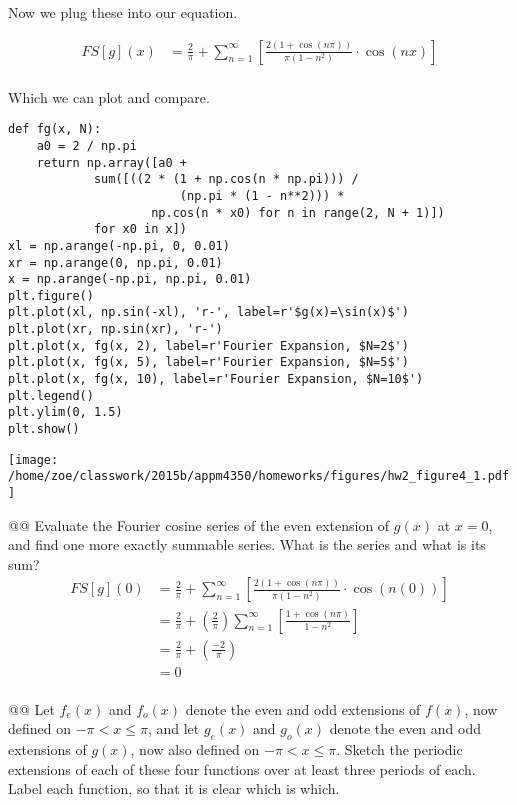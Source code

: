\documentclass[10pt]{article}
\begin{document}
\begin{easylist}[enumerate]
    Now we plug these into our equation.

    \begin{align*}
        FS[g](x) &= \frac{2}{\pi} + \sum_{n=1}^\infty \left[ \frac{2(1 + \cos(n\pi))}{\pi(1-n^2)} \cdot \cos(nx) \right]\\
    \end{align*}

    Which we can plot and compare.

\weave

\begin{verbatim}
def fg(x, N):
    a0 = 2 / np.pi
    return np.array([a0 +
            sum([((2 * (1 + np.cos(n * np.pi))) /
                        (np.pi * (1 - n**2))) *
                    np.cos(n * x0) for n in range(2, N + 1)])
            for x0 in x])
xl = np.arange(-np.pi, 0, 0.01)
xr = np.arange(0, np.pi, 0.01)
x = np.arange(-np.pi, np.pi, 0.01)
plt.figure()
plt.plot(xl, np.sin(-xl), 'r-', label=r'$g(x)=\sin(x)$')
plt.plot(xr, np.sin(xr), 'r-')
plt.plot(x, fg(x, 2), label=r'Fourier Expansion, $N=2$')
plt.plot(x, fg(x, 5), label=r'Fourier Expansion, $N=5$')
plt.plot(x, fg(x, 10), label=r'Fourier Expansion, $N=10$')
plt.legend()
plt.ylim(0, 1.5)
plt.show()
\end{verbatim}
\texttt{[image: /home/zoe/classwork/2015b/appm4350/homeworks/figures/hw2\_figure4\_1.pdf]}

\noweave

    @@ Evaluate the Fourier cosine series of the even extension of $g(x)$ at $x=0$, and find one more exactly summable
    series. What is the series and what is its sum?\\

    \begin{align*}
        FS[g](0) &= \frac{2}{\pi} + \sum_{n=1}^\infty \left[ \frac{2(1 + \cos(n\pi))}{\pi(1-n^2)} \cdot \cos(n(0)) \right]\\
        &= \frac{2}{\pi} + \left(\frac{2}{\pi}\right) \sum_{n=1}^\infty \left[ \frac{1 + \cos(n\pi)}{1-n^2} \right]\\
        &= \frac{2}{\pi} + \left(\frac{-2}{\pi}\right)\\
        &= 0\\
    \end{align*}

    @@ Let $f_e(x)$ and $f_o(x)$ denote the even and odd extensions of $f(x)$, now defined on $-\pi < x \le \pi$, and
    let $g_e(x)$ and $g_o(x)$ denote the even and odd extensions of $g(x)$, now also defined on $-\pi < x \le \pi$.
    Sketch the periodic extensions of each of these four functions over at least three periods of each. Label each
    function, so that it is clear which is which.\\


\end{easylist}
\end{document}
